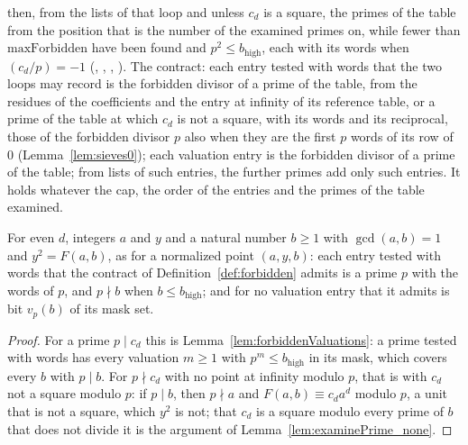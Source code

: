 \begin{definition}
  then, from the lists of that loop and unless $c_d$ is a square, the primes of the table from the
  position that is the number of the examined primes on, while fewer than $\mathrm{maxForbidden}$
  have been found and $p^2 \le b_{\mathrm{high}}$, each with its words when $(c_d / p) = -1$
  (, ,
  , ). The contract: each
  entry tested with words that the two loops may record is the forbidden divisor of a prime of the
  table, from the residues of the coefficients and the entry at infinity of its reference table, or
  a prime of the table at which $c_d$ is not a square, with its words and its reciprocal, those of
  the forbidden divisor $p$ also when they are the first $p$ words of its row of $0$
  (Lemma~\ref{lem:sieves0}); each valuation entry is the forbidden divisor of a prime of the table;
  from lists of such entries, the further primes add only such entries. It holds whatever the cap,
  the order of the entries and the primes of the table examined.
\end{definition}

\begin{lemma}\label{lem:forbidden}
  \leanok
  For even $d$, integers $a$ and $y$ and a natural number $b \ge 1$ with $\gcd(a, b) = 1$ and
  $y^2 = F(a, b)$, as for a normalized point $(a, y, b)$: each entry tested with words that the
  contract of Definition~\ref{def:forbidden} admits is a prime $p$ with the words of $p$, and
  $p \nmid b$ when $b \le b_{\mathrm{high}}$; and for no valuation entry that it admits is bit
  $v_p(b)$ of its mask set.
\end{lemma}

\begin{proof}
  \leanok
  For a prime $p \mid c_d$ this is Lemma~\ref{lem:forbiddenValuations}: a prime tested with words
  has every valuation $m \ge 1$ with $p^m \le b_{\mathrm{high}}$ in its mask, which covers every $b$
  with $p \mid b$. For $p \nmid c_d$ with no point at infinity modulo $p$, that is with $c_d$ not a
  square modulo $p$: if $p \mid b$, then $p \nmid a$ and $F(a, b) \equiv c_d a^d$ modulo $p$, a unit
  that is not a square, which $y^2$ is not; that $c_d$ is a square modulo every prime of $b$ that
  does not divide it is the argument of Lemma~\ref{lem:examinePrime_none}.
\end{proof}

